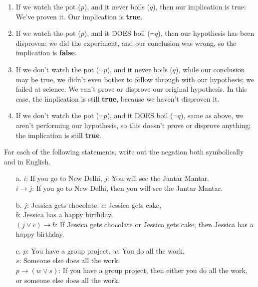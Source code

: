 {\begin{introNOHEAD}
        \begin{enumerate}            
            \item If we watch the pot ($p$), and it never boils ($q$), then our implication is true:
                We've proven it. Our implication is \textbf{true}.
            \item If we watch the pot ($p$), and it DOES boil ($\neg q$), then our hypothesis has been disproven:
                we did the experiment, and our conclusion was wrong, so the implication is \textbf{false}.
            \item If we don't watch the pot ($\neg p$), and it never boils ($q$), while our conclusion
                may be true, we didn't even bother to follow through with our hypothesis; we failed at science.
                We can't prove or disprove our original hypothesis. In this case, the implication is
                still \textbf{true}, because we haven't disproven it.
            \item If we don't watch the pot ($\neg p$), and it DOES boil ($\neg q$), same as above,
                we aren't performing our hypothesis, so this doesn't prove or disprove anything;
                the implication is still \textbf{true}.
        \end{enumerate}
    \end{introNOHEAD}

    \newpage

    \begin{questionNOGRADE}{\thequestion}
        For each of the following statements, write out the negation
        both symbolically and in English.


        \begin{enumerate}
            \item[a.] $i$: If you go to New Delhi, $j$: You will see the Jantar Mantar. \\
                $i \to j$: If you go to New Delhi, then you will see the Jantar Mantar.
            \item[b.]
                $j$: Jessica gets chocolate,
                $c$: Jessica gets cake, \\
                $b$: Jessica has a happy birthday. \\
                $(j \lor c) \to b$: If Jessica gets chocolate or Jessica gets cake, then Jessica has a happy birthday.
            \item[c.]
                $p$: You have a group project, $w$: You do all the work, \\
                $s$: Someone else does all the work. \\
                $p \to (w \lor s)$: If you have a group project, then either you do all the work,
                    or someone else does all the work.
        \end{enumerate}        
    \end{questionNOGRADE}

}
